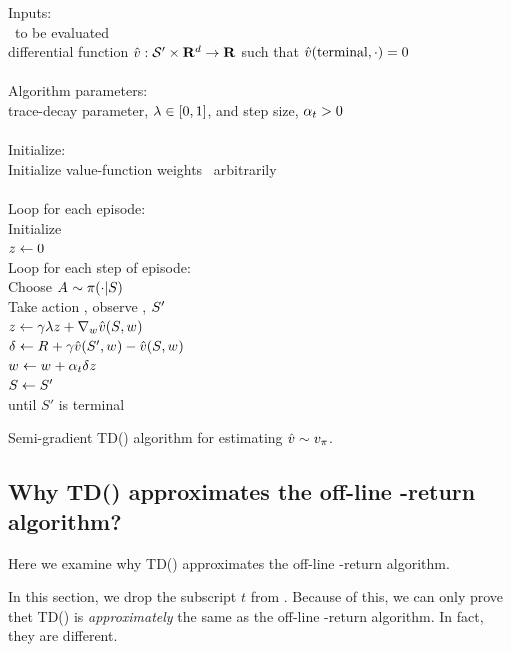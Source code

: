 \begin{table}
\beginalg
Inputs:\\
\> \pol\ to be evaluated
\\
\> differential function $\hat{v}: {\mathcal{S}'} \times \mathbf{R}^d \to \mathbf{R}$
	such that $\hat{v}(\mathrm{terminal}, \cdot) = 0$
\\\\
Algorithm parameters:
\\
\> trace-decay parameter, $\lambda \in [0,1]$, and step size, $\alpha_{t}>0$
\\\\
Initialize:
\\
\> Initialize value-function weights \wvector{}\ arbitrarily
\\\\
Loop for each episode:\\
\> Initialize \state\ \\
\> $z_{} \leftarrow 0$ \\
\> Loop for each step of episode: \\
\> \> Choose $A_{} \sim \pi(\cdot|S_{})$\\
\> \> Take action \action, observe \reward{}, $S_{}'$\\
\> \> $z_{} \leftarrow \gamma \lambda z_{} + \nabla_{{w_{}}} \hat{v}(S_{}, {w_{}})$\\
\> \> $\delta_{} \leftarrow R_{} + \gamma \hat{v}(S_{}', {w_{}}) - \hat{v}(S_{}, {w_{}})$\\
\> \> ${w_{}} \leftarrow {w_{}} + \alpha_{t} \delta_{} z_{}$\\
\> \> $S_{} \leftarrow S_{}'$
\\
\> until $S'$ is terminal
\endalg
\caption{Semi-gradient TD(\tdparam) algorithm for estimating $\hat{v} \sim v_{\pi}$.}
\label{tab:alg:et:semi-gradient}
\end{table}


\subsection{Why TD(\tdparam) approximates the off-line \tdparam-return algorithm?}

Here we examine why TD(\tdparam) approximates the off-line \tdparam-return algorithm.

In this section, we drop the subscript $t$ from .
Because of this, we can only prove thet TD(\tdparam) is \emph{approximately} the same as the off-line \tdparam-return algorithm.
In fact, they are different.

